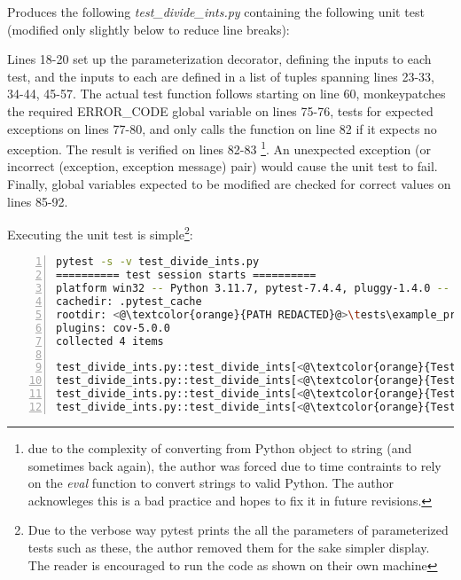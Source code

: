 Produces the following \textit{test\_divide\_ints.py} containing the following 
unit test (modified only slightly below to reduce line breaks):



Lines 18-20 set up the parameterization decorator, defining the inputs to each test,
and the inputs to each are defined in a list of tuples spanning lines 23-33, 
34-44, 45-57.  The actual test function follows starting on line 60, monkeypatches
the required ERROR\_CODE global variable on lines 75-76, tests for expected 
exceptions on lines 77-80, and only calls the function on line 82 if it expects 
no exception. The result is verified on lines 82-83
\footnote{due to the complexity of converting from Python object to string
(and sometimes back again), the author was forced due to time contraints to
rely on the \textit{eval} function to convert strings to valid Python.  
The author acknowleges this is a bad practice and hopes to fix it in
future revisions.}. An unexpected exception (or incorrect 
(exception, exception message) 
pair) would cause the unit test to fail.  Finally, global variables expected to be modified 
are checked for correct values on lines 85-92.

Executing the unit test is simple\footnote{Due to the verbose way pytest prints the 
all the parameters of  parameterized tests such as these, the author removed
them for the sake simpler display.  The reader is encouraged to run the code 
as shown on their own machine}:

\begin{lstlisting}[language=bash, numbers=left, caption={Running one of the generated unit tests}]
pytest -s -v test_divide_ints.py
========== test session starts ==========
platform win32 -- Python 3.11.7, pytest-7.4.4, pluggy-1.4.0 -- <@\textcolor{orange}{PATH REDACTED}@>\.venv\Scripts\python.exe
cachedir: .pytest_cache
rootdir: <@\textcolor{orange}{PATH REDACTED}@>\tests\example_procedural_division
plugins: cov-5.0.0
collected 4 items

test_divide_ints.py::test_divide_ints[<@\textcolor{orange}{Test \#1 arguments SNIPPED}@>] <@\textcolor{green}{PASSED}@>
test_divide_ints.py::test_divide_ints[<@\textcolor{orange}{Test \#2 arguments SNIPPED}@>] <@\textcolor{green}{PASSED}@>
test_divide_ints.py::test_divide_ints[<@\textcolor{orange}{Test \#3 arguments SNIPPED}@>] <@\textcolor{green}{PASSED}@>
test_divide_ints.py::test_divide_ints[<@\textcolor{orange}{Test \#4 arguments SNIPPED}@>] <@\textcolor{green}{PASSED}@>
\end{lstlisting}

